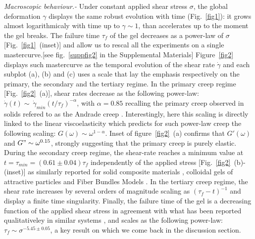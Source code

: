 \documentclass[twocolumn,superscriptaddress,showpacs,preprintnumbers,amsmath,amssymb,prl]{revtex4}
\begin{document}
\textit{Macroscopic behaviour.-} Under constant applied shear stress $\sigma$, the global deformation $\gamma$ displays the same robust evolution with time (Fig.~\ref{fig1}): it grows almost logarithmicaly with time up to $\gamma \sim 1$, than accelerates up to the moment the gel breaks. 
 The failure time $\tau_f$ of the gel decreases as a power-law of $\sigma$ [Fig.~\ref{fig1}~(inset)] and allow us to rescal all the experiments on a single mastercurve.[see fig.~\ref{suppfig2} in the Supplemental Materials]
Figure~\ref{fig2} displays such mastercurve as the temporal evolution of the shear rate $\dot \gamma$ and each subplot (a), (b) and (c) uses a scale that lay the emphasis respectively on the primary, the secondary and the tertiary regime.
In the primary creep regime [Fig.~\ref{fig2}~(a)], shear rates decrease as the following power-law:  $\dot \gamma(t) \sim~\dot \gamma_{min} (t/\tau_f)^{-\alpha}$, with $\alpha=0.85$ recalling the primary creep observed in solids refered to as the Andrade creep \cite{Miguel:2002}. Interestingly, here this scaling is directly linked to the linear viscoelasticity which predicts for such power-law creep the following scaling: $G(\omega) \sim \omega^{1-\alpha}$. Inset of figure~\ref{fig2}~(a) confirms that $G'(\omega)$ and $G"\sim \omega ^{0.15}$, strongly suggesting that the primary creep is purely elastic.
During the secondary creep regime, the shear-rate reaches a minimum value at $t=\tau_{min}= (0.61\pm0.04)\tau_f$ independently of the applied stress [Fig.~\ref{fig2}~(b)-(inset)] as similarly reported for solid composite materials \cite{Nechad:2005}, colloidal gels of attractive particles \cite{Grenard:2013} and Fiber Bundles Models \cite{Kovacs:2008,Jagla:2011}. 
In the tertiary creep regime, the shear rate increases by several orders of magnitude scaling as $(\tau_f-t)^{-1}$ and display a finite time singularity. Finally, the failure time of the gel is a decreasing function of the applied shear stress in agreement with what has been reported qualitativeley in similar systems \cite{vanVliet:1995}, and scales as the following power-law: $\tau_f \sim \sigma^{-5.45\pm 0.05}$, a key result on which we come back in the discussion section.
\end{document}
